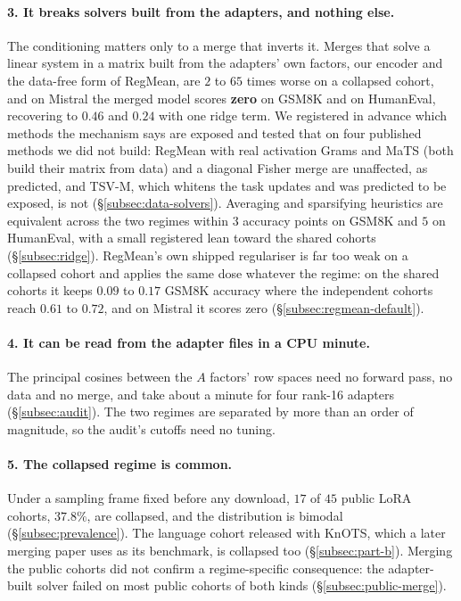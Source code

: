 \paragraph{3. It breaks solvers built from the adapters, and nothing else.}
The conditioning matters only to a merge that inverts it. Merges that solve a
linear system in a matrix built from the adapters' own factors, our encoder
and the data-free form of RegMean, are $2$ to $65$ times worse on a collapsed
cohort, and on Mistral the merged model scores \textbf{zero} on GSM8K and on
HumanEval, recovering to $0.46$ and $0.24$ with one ridge term. We registered
in advance which methods the mechanism says are exposed and tested that on four
published methods we did not build: RegMean with real activation Grams and MaTS
(both build their matrix from data) and a diagonal Fisher merge are unaffected,
as predicted, and TSV-M, which whitens the task updates and was predicted to be
exposed, is not (\S\ref{subsec:data-solvers}). Averaging and sparsifying
heuristics are equivalent across the two regimes within $3$ accuracy points on
GSM8K and $5$ on HumanEval, with a small registered lean toward the shared
cohorts (\S\ref{subsec:ridge}). RegMean's own shipped regulariser is far too
weak on a collapsed cohort and applies the same dose whatever the regime: on
the shared cohorts it keeps $0.09$ to $0.17$ GSM8K accuracy where the
independent cohorts reach $0.61$ to $0.72$, and on Mistral it scores zero
(\S\ref{subsec:regmean-default}).

\paragraph{4. It can be read from the adapter files in a CPU minute.} The
principal cosines between the $A$ factors' row spaces need no forward pass, no
data and no merge, and take about a minute for four rank-16 adapters
(\S\ref{subsec:audit}). The two regimes are separated by more than an order of
magnitude, so the audit's cutoffs need no tuning.

\paragraph{5. The collapsed regime is common.} Under a sampling frame fixed
before any download, $17$ of $45$ public LoRA cohorts, $37.8\%$, are collapsed,
and the distribution is bimodal (\S\ref{subsec:prevalence}). The language
cohort released with KnOTS, which a later merging paper uses as its benchmark,
is collapsed too (\S\ref{subsec:part-b}). Merging the public cohorts did not
confirm a regime-specific consequence: the adapter-built solver failed on most
public cohorts of both kinds (\S\ref{subsec:public-merge}).

